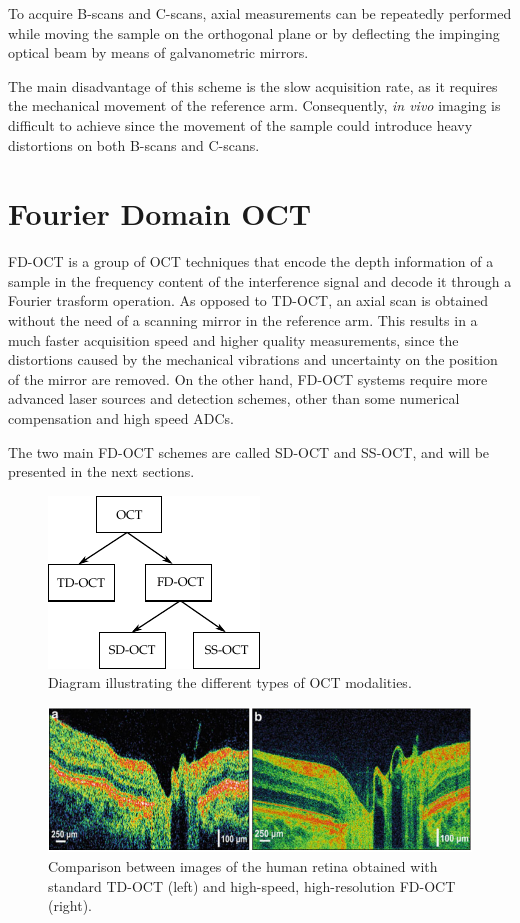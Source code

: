 To acquire B-scans and C-scans, axial measurements can be repeatedly performed while moving the sample on the orthogonal plane or by deflecting the impinging optical beam by means of galvanometric mirrors. 

The main disadvantage of this scheme is the slow acquisition rate, as it requires the mechanical movement of the reference arm. Consequently, \emph{in vivo} imaging is difficult to achieve since the movement of the sample could introduce heavy distortions on both B-scans and C-scans. 

\section{Fourier Domain OCT}
\label{sec:fdoct}
\acf{FD-OCT} is a group of OCT techniques that encode the depth information of a sample in the frequency content of the interference signal and decode it through a Fourier trasform operation. As opposed to \ac{TD-OCT}, an axial scan is obtained without the need of a scanning mirror in the reference arm. This results in a much faster acquisition speed and higher quality measurements, since the distortions caused by the mechanical vibrations and uncertainty on the position of the mirror are removed. On the other hand, \ac{FD-OCT} systems require more advanced laser sources and detection schemes, other than some numerical compensation and high speed \acp{ADC}. 


The two main \ac{FD-OCT} schemes are called \acf{SD-OCT} and \acf{SS-OCT}, and will be presented in the next sections. 

\begin{figure}[hbt]
	\myfloatalign
	\includegraphics[width=0.5\linewidth]{gfx/ch2/oct-modalities}
	\caption{Diagram illustrating the different types of OCT modalities.}\label{fig:oct-modalities}
\end{figure}

\begin{figure}[hbt]
	\myfloatalign
	\includegraphics[width=0.95\linewidth]{gfx/ch2/td-fd-comparison}
	\caption{Comparison between images of the human retina obtained with standard \ac{TD-OCT} (left) and high-speed, high-resolution \ac{FD-OCT} (right).}\label{fig:td-fd-comparison}
\end{figure}

